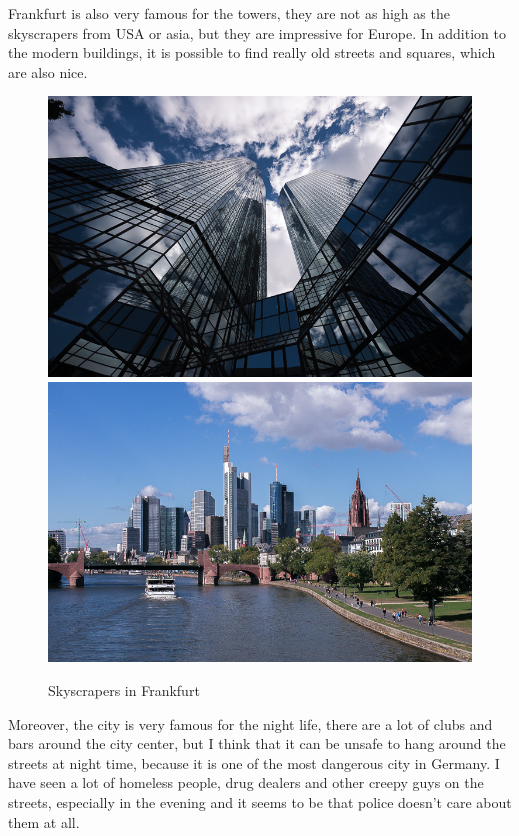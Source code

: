 \documentclass[english]{article}
\begin{document}
Frankfurt is also very famous for the towers, they are not as high as the skyscrapers from USA or asia, but they are impressive for Europe. In addition to the modern buildings, it is possible to find really old streets and squares, which are also nice.\\

\begin{figure}
\includegraphics[scale=0.33]{Germany_travel/fk1}\includegraphics[scale=0.33]{Germany_travel/fk2}\\
\caption{Skyscrapers in Frankfurt}
\end{figure}

Moreover, the city is very famous for the night life, there are a lot of clubs and bars around the city center, but I think that it can be unsafe to hang around the streets at night time, because it is one of the most dangerous city in Germany. I have seen a lot of homeless people, drug dealers and other creepy guys on the streets, especially in the evening and it seems to be that police doesn't care about them at all.\\
\end{document}
